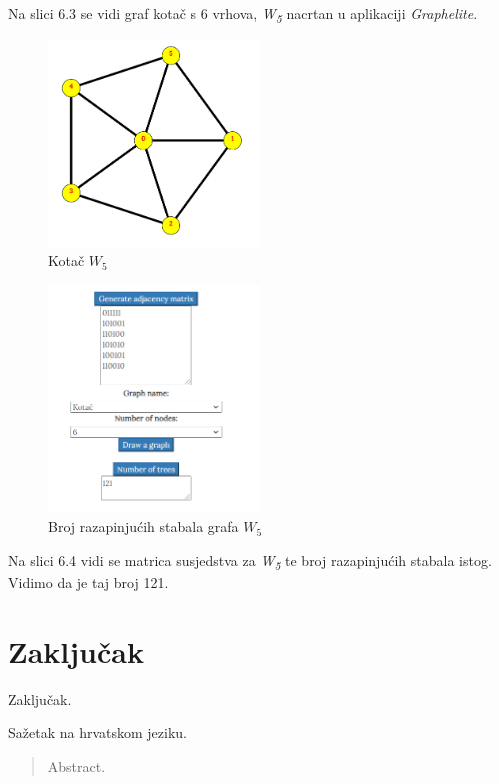\documentclass[times, utf8, zavrsni]{fer}
\begin{document}
Na slici 6.3 se vidi graf kotač s 6 vrhova, \textit{W\textsubscript{5}} nacrtan u aplikaciji \textit{Graphelite}.

\begin{figure}[htb]
	\centering
	\includegraphics[width=0.5\textwidth]{slike/kotac2.png}
	\caption{Kotač $W_5$}
	\label{fig:kotac}
\end{figure}

\begin{figure}[htb]
	\centering
	\includegraphics[width=0.5\textwidth]{slike/kotacbroj.png}
	\caption{Broj razapinjućih stabala grafa $W_5$}
	\label{fig:kotac-broj}
\end{figure}

Na slici 6.4 vidi se matrica susjedstva za \textit{W\textsubscript{5}} te broj razapinjućih stabala istog. Vidimo da je taj broj 121.
\chapter{Zaključak}
Zaključak.




\begin{sazetak}
Sažetak na hrvatskom jeziku.

\end{sazetak}

\begin{abstract}
Abstract.

\end{abstract}
\end{document}
